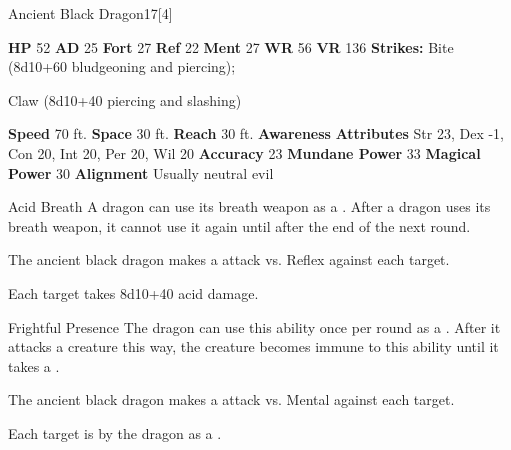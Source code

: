   \begin{monsubsection}{Ancient Black Dragon}{17}[4]
    \vspace{-1em}\vspace{-1em}
    \vspace{0em}

    
    

    \begin{spellcontent}
      \begin{spelltargetinginfo}
        \pari \textbf{HP} 52 \monsep
          \textbf{AD} 25 \monsep
          \textbf{Fort} 27 \monsep
          \textbf{Ref} 22 \monsep
          \textbf{Ment} 27
        \pari \textbf{WR} 56 \monsep
        \textbf{VR} 136
        \pari \textbf{Strikes:}
            Bite  (8d10+60 bludgeoning and piercing);
\par Claw  (8d10+40 piercing and slashing)
      \end{spelltargetinginfo}
    \end{spellcontent}
    \begin{monsterfooter}
      \pari \textbf{Speed} 70 ft. \monsep
        \textbf{Space} 30 ft. \monsep
        \textbf{Reach} 30 ft.
      \pari \textbf{Awareness} 
      \pari \textbf{Attributes}
        Str 23, Dex -1,
        Con 20, Int 20,
        Per 20, Wil 20
      \pari \textbf{Accuracy} 23 \monsep
        \textbf{Mundane Power} 33 \monsep
      \textbf{Magical Power} 30
      \pari \textbf{Alignment} Usually neutral evil
    \end{monsterfooter}
  \end{monsubsection}
  \begin{freeability}{Acid Breath}
      A dragon can use its breath weapon as a .
      After a dragon uses its breath weapon, it cannot use it again until after the end of the next round.
      \par The ancient black dragon makes a  attack
        vs. Reflex against each target.
    
    \hit Each target takes 8d10+40 acid damage.
    \end{freeability}
  

    \begin{freeability}{Frightful Presence}
      The dragon can use this ability once per round as a .
      After it attacks a creature this way, the creature becomes immune to this ability until it takes a .
      \par The ancient black dragon makes a  attack
        vs. Mental against each target.
    
    \hit Each target is  by the dragon as a .
    \end{freeability}
  
